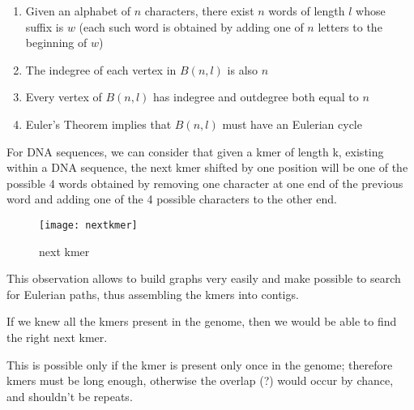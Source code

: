 \begin{enumerate}
	\item Given an alphabet of $n$ characters, there exist $n$ words of
length $l$ whose suffix is $w$ (each such word is obtained by adding one of
$n$ letters to the beginning of $w$)
	\item The indegree of each vertex in $B(n,l)$ is also $n$
	\item Every vertex of $B(n,l)$ has indegree and outdegree both equal to $n$
	\item Euler's Theorem implies that $B(n,l)$ must have an Eulerian cycle
\end{enumerate}

For DNA sequences, we can consider that given a kmer of length k,
existing within a DNA sequence, the next kmer shifted by one position will be
one of the possible 4 words obtained by removing one character at one end of
the previous word and adding one of the 4 possible characters to the other end.

\begin{figure}[H]
  \centering
  \texttt{[image: nextkmer]}
  \caption{next kmer}
  \label{fig:nextkmer}
\end{figure}

This observation allows to build graphs very easily and make possible to search
for Eulerian paths, thus assembling the kmers into contigs.

If we knew all the kmers present in the genome, then we would be able to find
the right next kmer.

This is possible only if the kmer is present only once in the genome;
therefore kmers must be long enough, otherwise the overlap (?) would occur by
chance, and shouldn’t be repeats.

